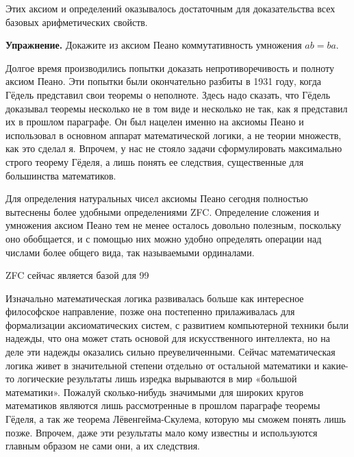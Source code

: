 Этих аксиом и определений оказывалось достаточным для доказательства всех базовых арифметических свойств.

{\bfseries Упражнение.} Докажите из аксиом Пеано коммутативность умножения $ab=ba$.

Долгое время производились попытки доказать непротиворечивость и полноту аксиом Пеано. Эти попытки были окончательно разбиты в 1931 году, когда Гёдель представил свои теоремы о неполноте. Здесь надо сказать, что Гёдель доказывал теоремы несколько не в том виде и несколько не так, как я представил их в прошлом параграфе. Он был нацелен именно на аксиомы Пеано и использовал в основном аппарат математической логики, а не теории множеств, как это сделал я. Впрочем, у нас не стояло задачи сформулировать максимально строго теорему Гёделя, а лишь понять ее следствия, существенные для большинства математиков.

Для определения натуральных чисел аксиомы Пеано сегодня полностью вытеснены более удобными определениями ZFC. Определение сложения и умножения аксиом Пеано тем не менее осталось довольно полезным, поскольку оно обобщается, и с помощью них  можно удобно определять операции над числами более общего вида, так называемыми ординалами.

ZFC сейчас является базой для 99%

Изначально математическая логика развивалась больше как интересное философское направление, позже она постепенно прилаживалась для формализации аксиоматических систем, с развитием компьютерной техники были надежды, что она может стать основой для искусственного интеллекта, но на деле эти надежды оказались сильно преувеличенными. Сейчас математическая логика живет в значительной степени отдельно от остальной математики и какие-то логические результаты лишь изредка вырываются в мир «большой математики». Пожалуй сколько-нибудь значимыми для широких кругов математиков являются лишь рассмотренные в прошлом параграфе теоремы Гёделя, а так же теорема Лёвенгейма-Скулема, которую мы сможем понять лишь позже. Впрочем, даже эти результаты мало кому известны и используются главным образом не сами они, а их следствия.
